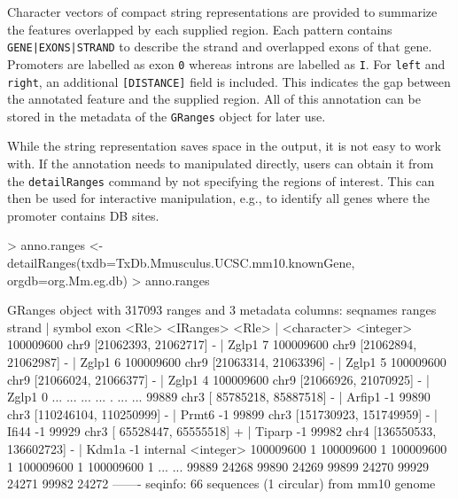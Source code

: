 \documentclass[12pt]{report}
\renewenvironment{Schunk}{\vspace{0pt}}{\vspace{0pt}}
\newcommand{\code}[1]{{\small\texttt{#1}}}
\begin{document}
Character vectors of compact string representations are provided to summarize the features overlapped by each supplied region. 
Each pattern contains \code{GENE|EXONS|STRAND} to describe the strand and overlapped exons of that gene. 
Promoters are labelled as exon \code{0} whereas introns are labelled as \code{I}. 
For \code{left} and \code{right}, an additional \code{[DISTANCE]} field is included.
This indicates the gap between the annotated feature and the supplied region.
All of this annotation can be stored in the metadata of the \code{GRanges} object for later use.

\begin{Schunk}
\end{Schunk}

While the string representation saves space in the output, it is not easy to work with.
If the annotation needs to manipulated directly, users can obtain it from the \code{detailRanges} command by not specifying the regions of interest. 
This can then be used for interactive manipulation, e.g., to identify all genes where the promoter contains DB sites.

\begin{Schunk}
\begin{Sinput}
> anno.ranges <- detailRanges(txdb=TxDb.Mmusculus.UCSC.mm10.knownGene, orgdb=org.Mm.eg.db)
> anno.ranges
\end{Sinput}
\begin{Soutput}
GRanges object with 317093 ranges and 3 metadata columns:
            seqnames                 ranges strand |      symbol      exon
               <Rle>              <IRanges>  <Rle> | <character> <integer>
  100009600     chr9   [21062393, 21062717]      - |       Zglp1         7
  100009600     chr9   [21062894, 21062987]      - |       Zglp1         6
  100009600     chr9   [21063314, 21063396]      - |       Zglp1         5
  100009600     chr9   [21066024, 21066377]      - |       Zglp1         4
  100009600     chr9   [21066926, 21070925]      - |       Zglp1         0
        ...      ...                    ...    ... .         ...       ...
      99889     chr3 [ 85785218,  85887518]      - |      Arfip1        -1
      99890     chr3 [110246104, 110250999]      - |       Prmt6        -1
      99899     chr3 [151730923, 151749959]      - |       Ifi44        -1
      99929     chr3 [ 65528447,  65555518]      + |      Tiparp        -1
      99982     chr4 [136550533, 136602723]      - |       Kdm1a        -1
             internal
            <integer>
  100009600         1
  100009600         1
  100009600         1
  100009600         1
  100009600         1
        ...       ...
      99889     24268
      99890     24269
      99899     24270
      99929     24271
      99982     24272
  -------
  seqinfo: 66 sequences (1 circular) from mm10 genome
\end{Soutput}
\end{Schunk}
\end{document}
